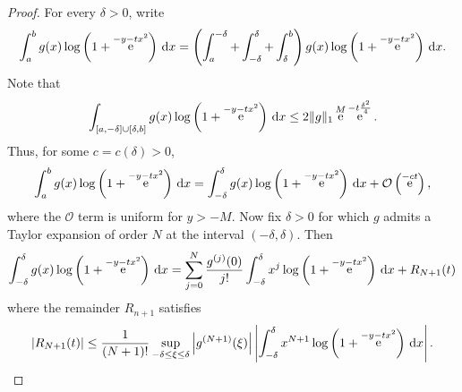 \documentclass[10pt,a4paper]{amsart}
\DeclareMathOperator{\ee}{\rm e}
\newcommand{\Boh}{\mathcal{O}}
\newcommand{\dd}{\mathrm{d}}
\begin{document}
\begin{proof}
    For every $\delta > 0$, write
    \[
        \int_{a}^b g(x) \log\left(1 + \ee^{- y - t x^2} \right) \, \dd x = 
        \left( \int_{a}^{-\delta} + \int_{-\delta}^\delta + \int_\delta^b  \right) g(x)  \log\left(1 + \ee^{- y - t x^2} \right) \, \dd x.
    \]
    Note that
    \[
       \int_{[a, -\delta] \cup [\delta, b]} g(x) \log\left(1 + \ee^{- y - t x^2} \right) \, \dd x  \leq 2 \| g \|_1 \ee^M \ee^{-t \frac{\delta^2}{4}}.
    \]
    Thus, for some $c = c(\delta)> 0$,
    \begin{equation}\label{eq:appendix1_estimate1}
        \int_{a}^b g(x) \log\left(1 + \ee^{- y - t x^2} \right) \, \dd x = 
        \int_{-\delta}^\delta g(x) \log\left(1 + \ee^{- y - t x^2} \right) \, \dd x +  \Boh \left( \ee^{- c t}\right),
    \end{equation}
    where the $\Boh$ term is uniform for $y > -M$.
    Now fix $\delta > 0$ for which $g$ admits a Taylor expansion of order $N$ at the interval $(-\delta, \delta)$. Then
    \[
        \int_{-\delta}^\delta g(x) \log\left(1 + \ee^{- y - t x^2} \right) \, \dd x 
        = \sum_{j=0}^N \frac{g^{(j)}(0)}{j!} \int_{-\delta}^\delta x^j \log\left(1 + \ee^{- y - t x^2} \right) \, \dd x + R_{N+1}(t)
    \]
    where the remainder $R_{n+1}$ satisfies
    \[
        \left| R_{N+1}(t) \right| \leq \frac{1}{(N+1)!} \sup_{- \delta \leq \xi \leq \delta} \left| g^{(N+1)}(\xi) \right| \left| \int_{-\delta}^{\delta} x^{N+1} \log\left(1 + \ee^{- y - t x^2} \right) \, \dd x \right|.
    \]


\end{proof}
\end{document}
